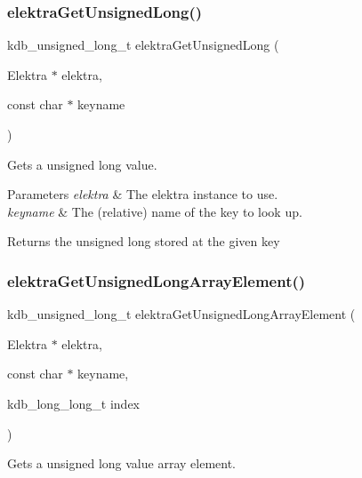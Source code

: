 \subsubsection{\texorpdfstring{elektraGetUnsignedLong()}{elektraGetUnsignedLong()}}
{\footnotesize\ttfamily kdb\+\_\+unsigned\+\_\+long\+\_\+t elektra\+Get\+Unsigned\+Long (\begin{DoxyParamCaption}\item[{Elektra $\ast$}]{elektra,  }\item[{const char $\ast$}]{keyname }\end{DoxyParamCaption})}



Gets a unsigned long value. 


\begin{DoxyParams}{Parameters}
{\em elektra} & The elektra instance to use. \\
\hline
{\em keyname} & The (relative) name of the key to look up. \\
\hline
\end{DoxyParams}
\begin{DoxyReturn}{Returns}
the unsigned long stored at the given key 
\end{DoxyReturn}
\mbox{\label{group__highlevel_ga8eb3597a96134c11f5d04a4613c44b92}} 
\subsubsection{\texorpdfstring{elektraGetUnsignedLongArrayElement()}{elektraGetUnsignedLongArrayElement()}}
{\footnotesize\ttfamily kdb\+\_\+unsigned\+\_\+long\+\_\+t elektra\+Get\+Unsigned\+Long\+Array\+Element (\begin{DoxyParamCaption}\item[{Elektra $\ast$}]{elektra,  }\item[{const char $\ast$}]{keyname,  }\item[{kdb\+\_\+long\+\_\+long\+\_\+t}]{index }\end{DoxyParamCaption})}



Gets a unsigned long value array element. 


